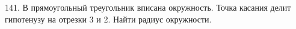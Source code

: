 141. В прямоугольный треугольник вписана окружность. Точка касания делит гипотенузу на отрезки 3 и 2. Найти радиус окружности.\\
